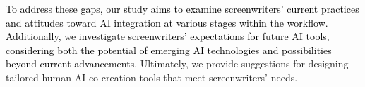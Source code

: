 \textcolor{black}{To address these gaps, our study aims to examine screenwriters' current practices and attitudes toward AI integration at various stages within the workflow. Additionally, we investigate screenwriters’ expectations for future AI tools, considering both the potential of emerging AI technologies and possibilities beyond current advancements.} 
Ultimately, we provide suggestions for designing tailored human-AI co-creation tools that meet screenwriters' needs.





